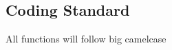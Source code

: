 \subsection{Coding Standard}
\label{subsec:coding_standard}

All functions will follow big camelcase